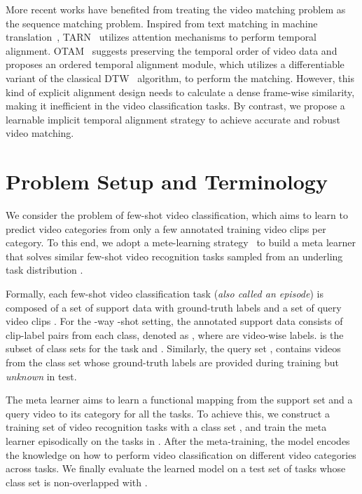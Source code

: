 \documentclass{article}
\begin{document}
More recent works have benefited from treating the video matching problem as the sequence matching problem. Inspired from text matching in machine translation~\cite{bahdanau2014neural,wang2016compare}, TARN~\cite{bishay2019tarn} utilizes attention mechanisms to perform temporal alignment. OTAM~\cite{cao2020few} suggests preserving the temporal order of video data and proposes an ordered temporal alignment module, which utilizes a differentiable variant of the classical DTW~\cite{muller2007dynamic} algorithm, to perform the matching. However, this kind of explicit alignment design needs to calculate a dense frame-wise similarity, making it inefficient in the video classification tasks.
By contrast, we propose a learnable implicit temporal alignment strategy to achieve accurate and robust video matching.





 \section{Problem Setup and Terminology}\label{sec:setting}
We consider the problem of few-shot video classification, which aims to learn to predict video categories from only a few annotated training video clips per category. To this end, we adopt a mete-learning strategy~\cite{vinyals2016matching} to build a meta learner  that solves similar few-shot video recognition tasks  sampled from an underling task distribution . 

Formally, each few-shot video classification task  (\textit{also called an episode}) is composed of a set of support data  with ground-truth labels and a set of query video clips . For the -way -shot setting, the annotated support data consists of  clip-label pairs from each class, denoted as , where  are video-wise labels.  is the subset of class sets for the task  and . Similarly, the query set , contains  videos from the class set  whose ground-truth labels  are provided during training but \textit{unknown} in test.

The meta learner  aims to learn a functional mapping from the support set  and a query video  to its category  for all the tasks. To achieve this, we construct a training set of video recognition tasks  with a class set , and train the meta learner episodically on the tasks in . After the meta-training, the model  encodes the knowledge on how to perform video classification on different video categories across tasks. We finally evaluate the learned model on a test set of tasks  whose class set  is non-overlapped with .
\end{document}
